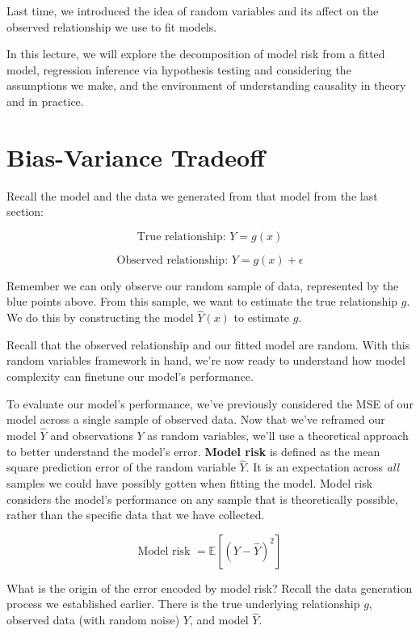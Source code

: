 \documentclass[
  letterpaper,
  DIV=11,
  numbers=noendperiod]{scrreprt}
\begin{document}
Last time, we introduced the idea of random variables and its affect on
the observed relationship we use to fit models.

In this lecture, we will explore the decomposition of model risk from a
fitted model, regression inference via hypothesis testing and
considering the assumptions we make, and the environment of
understanding causality in theory and in practice.

\hypertarget{bias-variance-tradeoff}{%
\section{Bias-Variance Tradeoff}\label{bias-variance-tradeoff}}

Recall the model and the data we generated from that model from the last
section:

\[\text{True relationship: }Y = g(x)\]

\[\text{Observed relationship: }Y = g(x) + \epsilon\]

Remember we can only observe our random sample of data, represented by
the blue points above. From this sample, we want to estimate the true
relationship \(g\). We do this by constructing the model \(\hat{Y}(x)\)
to estimate \(g\).

Recall that the observed relationship and our fitted model are random.
With this random variables framework in hand, we're now ready to
understand how model complexity can finetune our model's performance.

To evaluate our model's performance, we've previously considered the MSE
of our model across a single sample of observed data. Now that we've
reframed our model \(\hat{Y}\) and observations \(Y\) as random
variables, we'll use a theoretical approach to better understand the
model's error. \textbf{Model risk} is defined as the mean square
prediction error of the random variable \(\hat{Y}\). It is an
expectation across \emph{all} samples we could have possibly gotten when
fitting the model. Model risk considers the model's performance on any
sample that is theoretically possible, rather than the specific data
that we have collected.

\[\text{Model risk }=\mathbb{E}\left[(Y-\hat{Y})^2\right]\]

What is the origin of the error encoded by model risk? Recall the data
generation process we established earlier. There is the true underlying
relationship \(g\), observed data (with random noise) \(Y\), and model
\(\hat{Y}\).
\end{document}
